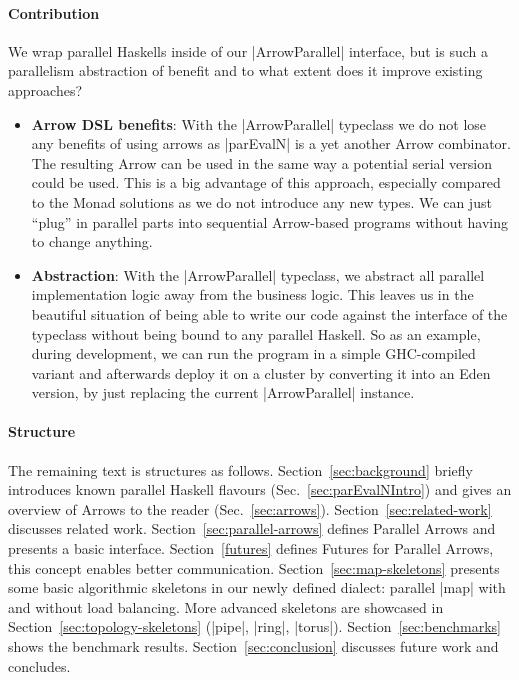 \paragraph{Contribution}
%
%
We wrap parallel Haskells inside of our |ArrowParallel| interface, but
 is such a parallelism abstraction of benefit and to what extent does
 it improve existing approaches?
\begin{itemize}
	\item \textbf{Arrow DSL benefits}:
	With the |ArrowParallel| typeclass we do not lose any benefits of using arrows as |parEvalN| is a yet another Arrow combinator. The resulting Arrow can be used in the same way a potential serial version could be used. This is a big advantage of this approach, especially compared to the Monad solutions as we do not introduce any new types. We can just \enquote{plug} in parallel parts into sequential Arrow-based programs without having to change anything.
	\item \textbf{Abstraction}:
	With the |ArrowParallel| typeclass, we abstract all parallel implementation logic away from the business logic. This leaves us in the beautiful situation of being able to write our code against the interface of the typeclass without being bound to any parallel Haskell. So as an example, during development, we can run the program in a simple GHC-compiled variant and afterwards deploy it on a cluster by converting it into an Eden version, by just replacing the current |ArrowParallel| instance.
\end{itemize}


\paragraph{Structure}
The remaining text is structures as follows. Section~\ref{sec:background} briefly introduces known parallel Haskell flavours (Sec.~\ref{sec:parEvalNIntro}) and gives an overview of Arrows to the reader (Sec.~\ref{sec:arrows}). Section~\ref{sec:related-work} discusses related work. Section~\ref{sec:parallel-arrows} defines Parallel Arrows and presents a basic interface. Section~\ref{futures} defines Futures for Parallel Arrows, this concept enables better communication. Section~\ref{sec:map-skeletons} presents some basic algorithmic skeletons  in our newly defined dialect: parallel |map| with and without load balancing. More advanced skeletons are showcased in Section~\ref{sec:topology-skeletons} (|pipe|, |ring|, |torus|). Section~\ref{sec:benchmarks} shows the benchmark results. Section~\ref{sec:conclusion} discusses future work and concludes.

